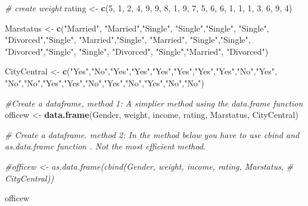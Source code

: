 \documentclass[
]{article}
\newenvironment{Shaded}{\begin{snugshade}}{\end{snugshade}}
\newcommand{\CommentTok}[1]{\textcolor[rgb]{0.56,0.35,0.01}{\textit{#1}}}
\newcommand{\DecValTok}[1]{\textcolor[rgb]{0.00,0.00,0.81}{#1}}
\newcommand{\FunctionTok}[1]{\textcolor[rgb]{0.13,0.29,0.53}{\textbf{#1}}}
\newcommand{\NormalTok}[1]{#1}
\newcommand{\OtherTok}[1]{\textcolor[rgb]{0.56,0.35,0.01}{#1}}
\newcommand{\StringTok}[1]{\textcolor[rgb]{0.31,0.60,0.02}{#1}}
\begin{document}
\begin{Shaded}
\begin{Highlighting}[]
\CommentTok{\# create weight}
\NormalTok{rating }\OtherTok{\textless{}{-}} \FunctionTok{c}\NormalTok{(}\DecValTok{5}\NormalTok{, }\DecValTok{1}\NormalTok{, }\DecValTok{2}\NormalTok{, }\DecValTok{4}\NormalTok{, }\DecValTok{9}\NormalTok{, }\DecValTok{9}\NormalTok{, }\DecValTok{8}\NormalTok{, }\DecValTok{1}\NormalTok{, }\DecValTok{9}\NormalTok{, }\DecValTok{7}\NormalTok{, }
            \DecValTok{5}\NormalTok{, }\DecValTok{6}\NormalTok{, }\DecValTok{6}\NormalTok{, }\DecValTok{1}\NormalTok{, }\DecValTok{1}\NormalTok{, }\DecValTok{1}\NormalTok{, }\DecValTok{3}\NormalTok{, }\DecValTok{6}\NormalTok{, }\DecValTok{9}\NormalTok{, }\DecValTok{4}\NormalTok{) }

\NormalTok{Marstatus }\OtherTok{\textless{}{-}} \FunctionTok{c}\NormalTok{(}\StringTok{"Married"}\NormalTok{, }\StringTok{"Married"}\NormalTok{,}\StringTok{"Single"}\NormalTok{, }\StringTok{"Single"}\NormalTok{,}\StringTok{"Single"}\NormalTok{,}
             \StringTok{"Single"}\NormalTok{, }\StringTok{"Divorced"}\NormalTok{,}\StringTok{"Single"}\NormalTok{, }\StringTok{"Married"}\NormalTok{,}\StringTok{"Single"}\NormalTok{,}
             \StringTok{"Married"}\NormalTok{, }\StringTok{"Single"}\NormalTok{,}\StringTok{"Single"}\NormalTok{, }\StringTok{"Divorced"}\NormalTok{,}\StringTok{"Single"}\NormalTok{,}
             \StringTok{"Single"}\NormalTok{, }\StringTok{"Divorced"}\NormalTok{, }\StringTok{"Single"}\NormalTok{,}\StringTok{"Married"}\NormalTok{, }\StringTok{"Divorced"}\NormalTok{)}

\NormalTok{CityCentral }\OtherTok{\textless{}{-}} \FunctionTok{c}\NormalTok{(}\StringTok{"Yes"}\NormalTok{,}\StringTok{"No"}\NormalTok{,}\StringTok{"Yes"}\NormalTok{,}\StringTok{"Yes"}\NormalTok{,}\StringTok{"Yes"}\NormalTok{,}\StringTok{"Yes"}\NormalTok{,}\StringTok{"Yes"}\NormalTok{,}\StringTok{"Yes"}\NormalTok{,}\StringTok{"No"}\NormalTok{,}\StringTok{"Yes"}\NormalTok{,}
                 \StringTok{"No"}\NormalTok{,}\StringTok{"No"}\NormalTok{,}\StringTok{"Yes"}\NormalTok{,}\StringTok{"Yes"}\NormalTok{,}\StringTok{"No"}\NormalTok{,}\StringTok{"Yes"}\NormalTok{,}\StringTok{"No"}\NormalTok{,}\StringTok{"Yes"}\NormalTok{,}\StringTok{"No"}\NormalTok{,}\StringTok{"No"}\NormalTok{)}


\CommentTok{\#Create a dataframe, method 1: A simplier method using the \textasciigrave{}data.frame\textasciigrave{} function }
\NormalTok{officew }\OtherTok{\textless{}{-}} \FunctionTok{data.frame}\NormalTok{(Gender, weight, income, rating, Marstatus, }
\NormalTok{                               CityCentral)}

\CommentTok{\# Create a dataframe. method 2:  In the method below you have to use  cbind and \textasciigrave{}as.data.frame\textasciigrave{} function . Not the most efficient method.}

\CommentTok{\#officew \textless{}{-} as.data.frame(cbind(Gender, weight, income, rating, Marstatus, }
                           \CommentTok{\#    CityCentral))}

\NormalTok{officew }
\end{Highlighting}
\end{Shaded}
\end{document}
